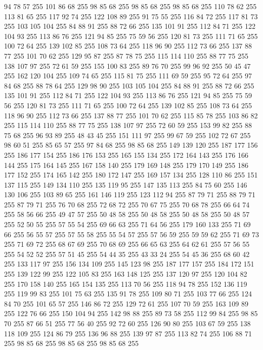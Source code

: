 94 78 57 255 101 86 68 255 98 85 68 255 98 85 68 255 98 85 68 255 110 78 62 255 113 81 65 255 117 92 74 255 122 108 89 255 91 75 55 255 116 84 72 255 117 81 73 255 103 105 104 255 84 88 91 255 88 72 66 255 135 101 91 255 112 84 71 255 122 104 93 255 113 86 76 255 121 94 85 255 75 59 56 255 120 81 73 255 111 71 65 255 100 72 64 255 139 102 85 255 108 73 64 255 118 96 90 255 112 73 66 255 137 88 77 255 101 70 62 255 129 95 87 255 87 78 75 255 115 114 110 255 88 77 75 255 138 107 97 255 72 61 59 255 155 100 83 255 89 76 70 255 99 96 92 255 50 45 47 255 162 120 104 255 109 74 65 255 115 81 75 255 111 69 59 255 95 72 64 255 97 84 68 255 88 78 64 255 129 98 90 255 103 105 104 255 84 88 91 255 88 72 66 255 135 101 91 255 112 84 71 255 122 104 93 255 113 86 76 255 121 94 85 255 75 59 56 255 120 81 73 255 111 71 65 255 100 72 64 255 139 102 85 255 108 73 64 255 118 96 90 255 112 73 66 255
137 88 77 255 101 70 62 255 115 85 78 255 103 86 82 255 115 114 110 255 88 77 75 255 138 107 97 255 72 60 59 255 153 99 82 255 88 75 68 255 96 93 89 255 48 43 45 255 151 111 97 255 99 67 59 255 102 72 67 255 98 60 51 255 85 65 57 255 97 84 68 255 98 85 68 255 149 139 120 255 187 177 156 255 186 177 154 255 186 176 153 255 165 155 134 255 172 164 143 255 176 166 144 255 175 164 145 255 167 158 140 255 179 169 148 255 179 170 149 255 186 177 152 255 174 165 142 255 180 172 147 255 169 157 134 255 128 110 86 255 151 137 115 255 149 134 110 255 135 119 95 255 147 135 113 255 84 75 60 255 146 130 106 255 103 89 65 255 161 146 119 255 123 112 94 255 87 79 71 255 88 79 71 255 87 79 71 255 76 70 68 255 72 68 72 255 70 67 75 255 70 68 78 255 66 64 74 255 58 56 66 255 49 47 57 255 50 48 58 255 50 48 58 255 50 48 58 255 50 48 57 255 52 50 55 255 57 55 54 255 69 66 63 255 71 64 56 255 179 160 133 255 71 69 66 255
56 55 57 255 57 55 58 255 55 54 57 255 57 56 59 255 59 59 62 255 71 69 73 255 71 69 72 255 68 67 69 255 70 68 69 255 66 65 63 255 64 62 61 255 57 56 55 255 54 52 52 255 57 51 45 255 54 44 35 255 43 33 24 255 54 45 36 255 68 60 42 255 133 117 97 255 156 134 109 255 145 123 98 255 187 177 157 255 184 172 151 255 139 122 99 255 122 105 83 255 163 148 125 255 137 120 97 255 120 104 82 255 170 158 140 255 165 154 135 255 113 70 56 255 118 94 78 255 152 136 119 255 119 99 83 255 101 75 63 255 135 91 78 255 109 80 71 255 103 77 66 255 124 84 70 255 101 65 57 255 146 86 72 255 129 72 61 255 107 70 59 255 163 109 89 255 122 76 66 255 150 104 94 255 142 98 88 255 89 73 58 255 112 99 84 255 98 85 70 255 87 66 51 255 77 56 40 255 92 72 60 255 126 90 80 255 103 67 59 255 138 118 109 255 124 86 79 255 136 96 88 255 139 97 87 255 113 82 74 255 106 88 71 255 98 85 68 255 98 85 68 255 98 85 68 255
